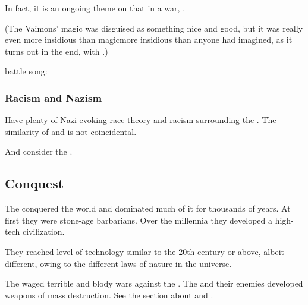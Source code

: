 In fact, it is an ongoing theme on \Miith that in a war, . 

(The Vaimons' magic was disguised as something nice and good, but it was really even more insidious than \xs magic\dash{}more insidious than anyone had imagined, as it turns out in the end, with \Lithrim.)

\Aryoth battle song:





\subsubsection{Racism and Nazism}
Have plenty of Nazi-evoking race theory and racism surrounding the \aryothim. 
The similarity of \quo{\aryoth} and  is not coincidental. 

And consider the . 










\subsection{Conquest}
The \aryothim conquered the world and dominated much of it for thousands of years.
At first they were stone-age barbarians.
Over the millennia they developed a high-tech civilization.

They reached level of technology similar to the 20th century or above, albeit different, owing to the different laws of nature in the \Miith universe.

The \aryothim waged terrible and blody wars against the \ophidians. 
The \aryothim and their \quiljaaran enemies developed weapons of mass destruction. 
See the section about  and . 

